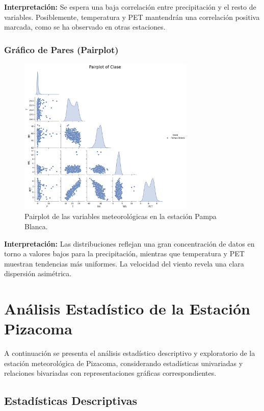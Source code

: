 \textbf{Interpretación:} Se espera una baja correlación entre precipitación y el resto de variables. Posiblemente, temperatura y PET mantendrán una correlación positiva marcada, como se ha observado en otras estaciones.

\subsubsection*{Gráfico de Pares (Pairplot)}
\begin{figure}[htbp]
\centering
\includegraphics[width=0.75\textwidth]{resultados/por_estacion_meteorologica/Pampa_Blanca/pairplot.png}
\caption{Pairplot de las variables meteorológicas en la estación Pampa Blanca.}
\label{fig:pampablanca_pairplot}
\end{figure}
\textbf{Interpretación:} Las distribuciones reflejan una gran concentración de datos en torno a valores bajos para la precipitación, mientras que temperatura y PET muestran tendencias más uniformes. La velocidad del viento revela una clara dispersión asimétrica.



\section{Análisis Estadístico de la Estación Pizacoma}

A continuación se presenta el análisis estadístico descriptivo y exploratorio de la estación meteorológica de Pizacoma, considerando estadísticas univariadas y relaciones bivariadas con representaciones gráficas correspondientes.

\subsection{Estadísticas Descriptivas}

